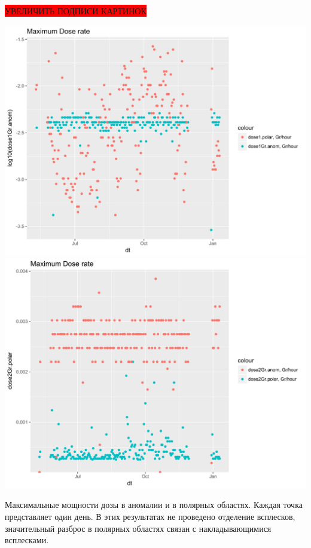 \documentclass[t, aspectratio=43]{beamer}
\begin{document}
\begin{frame}	
\frametitle{\insertsection} 
\colorbox{red}{УВЕЛИЧИТЬ ПОДПИСИ КАРТИНОК}

\begin{center}
		
	\includegraphics[width=0.5\linewidth]{dose1anompolar}
	\includegraphics[width=0.5\linewidth]{dose2anompolar}
\end{center}
{\tiny Максимальные мощности дозы в аномалии и в полярных областях. Каждая точка представляет один день. В этих результатах не проведено отделение всплесков, значительный разброс в полярных областях связан с накладывающимися всплесками.}

\end{frame}


\end{document}
